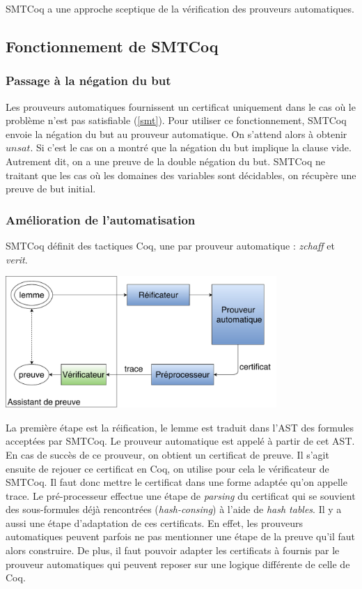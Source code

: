 \documentclass[11pt]{article}
\begin{document}
SMTCoq a une approche sceptique de la vérification des prouveurs automatiques.

\subsection{Fonctionnement de SMTCoq}

\subsubsection{Passage à la négation du but} \label{negation}

Les prouveurs automatiques fournissent un certificat uniquement dans le cas où le problème n'est pas satisfiable (\ref{smt}). Pour utiliser ce fonctionnement, SMTCoq envoie la négation du but au prouveur automatique. On s'attend alors à obtenir $unsat$. Si c'est le cas on a montré que la négation du but implique la clause vide. Autrement dit, on a une preuve de la double négation du but. SMTCoq ne traitant que les cas où les domaines des variables sont décidables, on récupère une preuve de but initial.


\subsubsection{Amélioration de l'automatisation}

SMTCoq définit des tactiques Coq, une par prouveur automatique : \textit{zchaff} et \textit{verit}. \\


\begin{center}
    \includegraphics[height=5cm]{Automatisation.pdf}
\end{center}

La première étape est la réification, le lemme est traduit dans l'AST des formules acceptées par SMTCoq. Le prouveur automatique est appelé à partir de cet AST. En cas de succès de ce prouveur, on obtient un certificat de preuve. 
Il s'agit ensuite de rejouer ce certificat en Coq, on utilise pour cela le vérificateur de SMTCoq. Il faut donc mettre le certificat dans une forme adaptée qu'on appelle trace. Le pré-processeur effectue une étape de \textit{parsing} du certificat qui se souvient des sous-formules déjà rencontrées (\textit{hash-consing}) à l'aide de \textit{hash tables}.  Il y a aussi une étape d'adaptation de ces certificats. En effet, les prouveurs automatiques peuvent parfois ne pas mentionner une étape de la preuve qu'il faut alors construire. De plus, il faut pouvoir adapter les certificats à fournis par le prouveur automatiques qui peuvent reposer sur une logique différente de celle de Coq. \\
\end{document}
